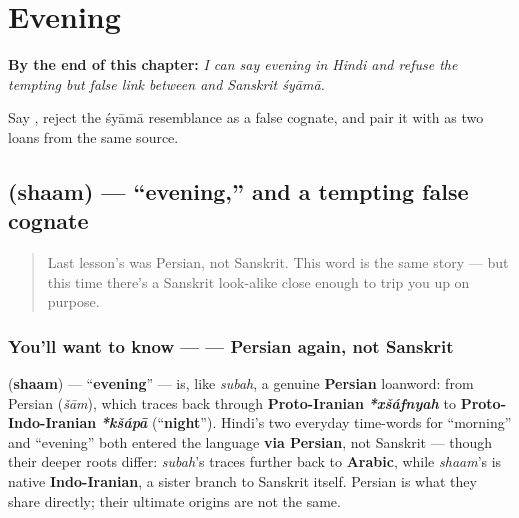 
\chapter{Evening}
\label{ch:hi-evening}

\begin{chapteropening}
\textbf{By the end of this chapter:} \emph{I can say evening in Hindi and refuse the tempting but false link between  and Sanskrit śyāmā.}

Say , reject the śyāmā resemblance as a false cognate, and pair it with  as two loans from the same source.
\end{chapteropening}

\section[\texorpdfstring{\hi{शाम} (shaam)}{शाम (shaam)}]{ (shaam) — \textquotedblleft{}evening,\textquotedblright{} and a tempting false cognate}

\label{lesson:HI-C29-shaam}



\begin{quote}
Last lesson's  was Persian, not Sanskrit. This word is the same story — but this time there's a Sanskrit look-alike close enough to trip you up on purpose.
\end{quote}

\subsection*{You'll want to know —  — Persian again, not Sanskrit}
\textbf{} (\textbf{shaam}) — \textquotedblleft{}\textbf{evening}\textquotedblright{} — is, like \emph{subah}, a genuine \textbf{Persian} loanword: from Persian \textbf{} (\emph{šām}), which traces back through \textbf{Proto-Iranian} \emph{\textbf{*xšáfnyah}} to \textbf{Proto-Indo-Iranian} \emph{\textbf{*kšápā}} (\textquotedblleft{}\textbf{night}\textquotedblright{}). Hindi's two everyday time-words for \textquotedblleft{}morning\textquotedblright{} and \textquotedblleft{}evening\textquotedblright{} both entered the language \textbf{via Persian}, not Sanskrit — though their deeper roots differ: \emph{subah}'s traces further back to \textbf{Arabic}, while \emph{shaam}'s is native \textbf{Indo-Iranian}, a sister branch to Sanskrit itself. Persian is what they share directly; their ultimate origins are not the same.

